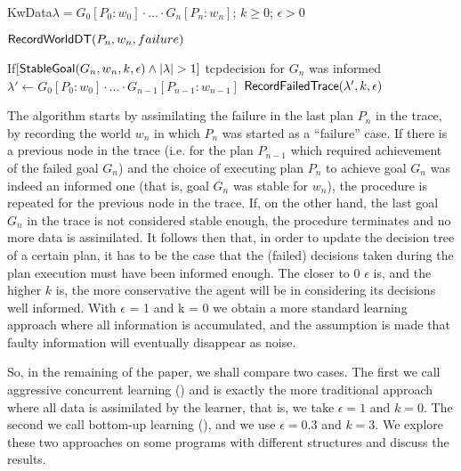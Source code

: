 \begin{algorithm}\caption{$\RecordTrace(\lambda,k,\epsilon)$}\label{algo:record_failed_exec}
KwData{$\lambda=G_0[P_0:w_0] \cdot \ldots \cdot G_n[P_n:w_n]$; $k\geq0$; $\epsilon > 0$}
\medskip

$\mathsf{RecordWorldDT}(P_n,w_n,failure)$

If{$[\StableGoal(G_n,w_n,k,\epsilon) \land |\lambda|>1]$} {
	tcp{\small decision for $G_n$ was informed}
	$\lambda' \longleftarrow G_0[P_0:w_0] \cdot \ldots \cdot G_{n-1}[P_{n-1}:w_{n-1}]$
	$\mathsf{RecordFailedTrace}(\lambda',k,\epsilon)$
}
\end{algorithm}

The algorithm starts by assimilating the failure in the last plan
$P_n$ in the trace, by recording the world $w_n$ in which $P_n$ was
started as a ``failure'' case.
If there is a previous node in the trace (i.e. for the plan $P_{n-1}$
which required achievement of the failed goal $G_n$) and the choice of
executing plan $P_n$ to achieve goal $G_n$ was indeed an informed one
(that is, goal $G_n$ was stable for $w_n$), the procedure is repeated
for the previous node in the trace.  If, on the other hand, the last
goal $G_n$ in the trace is not considered stable enough, the procedure
terminates and no more data is assimilated.
%
It follows then that, in order to update the decision tree of a certain
plan, it has to be the case that the (failed) decisions taken during
the plan execution must have been informed enough.
The closer to 0 $\epsilon$ is, and the higher $k$ is, the more
conservative the agent will be in considering its decisions well
informed. With $\epsilon$ = 1 and k = 0 we obtain a more standard
learning approach where all information is accumulated, and the
assumption is made that faulty information will eventually disappear
as noise.

So, in the remaining of the paper, we shall compare two cases. The first we call
aggressive concurrent learning (\CL) and is exactly the more traditional approach where all data is
assimilated by the learner, that is, we take $\epsilon = 1$ and $k = 0$.
The second we call bottom-up learning (\BUL), and we use $\epsilon = 0.3$ and
$k = 3$.
We explore these two approaches on some programs with different
structures  and discuss the results.
